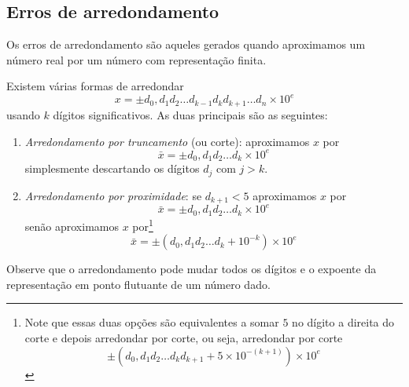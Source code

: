 \subsection{Erros de arredondamento}
Os erros de arredondamento são aqueles gerados quando aproximamos um número real por um número com representação finita.

Existem várias formas de arredondar 
\begin{equation*}
  x = \pm d_0,d_1d_2\ldots d_{k-1}d_kd_{k+1}\ldots d_n \times 10^e
\end{equation*}
usando $k$ dígitos significativos. As duas principais são as seguintes:
\begin{enumerate}
\item \emph{Arredondamento por truncamento} (ou corte): aproximamos $x$ por
$$
  \bar{x} = \pm d_{0},d_{1}d_{2}\ldots d_{k}\times 10^e
$$
simplesmente descartando os dígitos $d_{j}$ com $j > k$.
\item \emph{Arredondamento por proximidade}: se $d_{k+1}<5$ aproximamos $x$ por
$$
  \bar{x} = \pm d_0,d_1d_2\ldots d_{k}\times 10^{e}
$$
senão aproximamos $x$ por\footnote{Note que essas duas opções são equivalentes a somar $5$ no dígito a direita do corte e depois arredondar por corte, ou seja, arredondar por corte 
$$ \pm(d_0,d_1d_2\ldots d_kd_{k+1}+ 5 \times10^{-(k+1)} )\times 10^{e} $$}
$$
 \bar{x} = \pm(d_0,d_1d_2\ldots d_{k} + 10^{-k}) \times 10^{e}
$$
\end{enumerate}
\begin{obs}
  Observe que o arredondamento pode mudar todos os dígitos e o expoente da representação em ponto flutuante de um número dado.
\end{obs}



